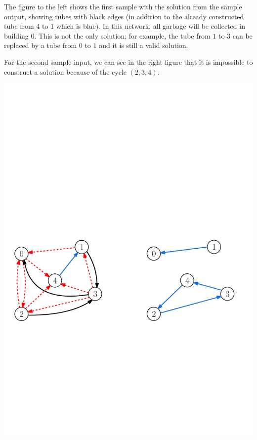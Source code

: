 The figure to the left shows the first sample with the solution from the sample output, 
showing tubes with black edges (in addition to the already constructed tube from $4$ to $1$ which is blue).
In this network, all garbage will be collected in building $0$. 
This is not the only solution; for example, the tube from $1$ to $3$ can be replaced
by a tube from $0$ to $1$ and it is still a valid solution.

For the second sample input, we can see in the right figure that it is impossible to construct a solution
because of the cycle $(2, 3, 4)$.

\begin{center}
  \includegraphics[width=.8\textwidth]{sample}
\end{center}

